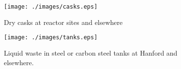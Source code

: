 

  \begin{figure}[htbp!]
    \begin{center}
    \begin{minipage}[t]{0.45\textwidth}
      \texttt{[image: ./images/casks.eps]}
      \caption{Dry casks at reactor sites and elsewhere \cite{nrc_dry_2008}}
        \label{fig:casks}
    \end{minipage}
    \hspace{0.01\textwidth}
    \begin{minipage}[t]{0.45\textwidth}
      \texttt{[image: ./images/tanks.eps]}
        \caption{Liquid waste in steel or carbon steel tanks at Hanford and
          elsewhere\cite{doe_underground_nodate}.}
        \label{fig:tanks}
    \end{minipage}
    \end{center}
  \end{figure}
